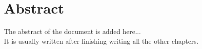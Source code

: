 \chapter*{Abstract}
\label{chap:abstract}
\pagestyle{plain}
The abstract of the document is added here...\\
It is usually written after finishing writing all the other chapters.